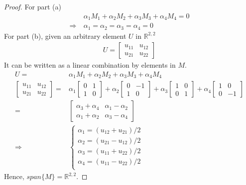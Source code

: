 \documentclass{article}
\theoremstyle{definition} %
\newcommand{\RR}{\mathbb{R}}
\begin{document}
\begin{proof}
    For part (a)
    \begin{align*}
        &\alpha_1 M_1 + \alpha_2 M_2 + \alpha_3 M_3 + \alpha_4 M_4 = 0
        \\
        \Rightarrow\ 
        &\alpha_1 = \alpha_2 = \alpha_3 = \alpha_4 = 0
    \end{align*}
    For part (b), given an arbitrary element $U$ in $\RR^{2,2}$
    \begin{align*}
        U = 
        \begin{bmatrix}
            u_{11} & u_{12}\\
            u_{21} & u_{22}
        \end{bmatrix}
    \end{align*}
    It can be written as a linear combination by elements in $M$.
    \begin{align*}
        U =& \alpha_1 M_1 + \alpha_2 M_2 + \alpha_3 M_3 + \alpha_4 M_4 \\
        \begin{bmatrix}
            u_{11} & u_{12}\\
            u_{21} & u_{22}
        \end{bmatrix}
        =& 
        \alpha_1
        \begin{bmatrix}
            0 & 1\\
            1 & 0
        \end{bmatrix}
        +
        \alpha_2
        \begin{bmatrix}
            0 & -1\\
            1 & 0
        \end{bmatrix}
        +
        \alpha_3
        \begin{bmatrix}
            1 & 0\\
            0 & 1
        \end{bmatrix}
        +
        \alpha_4
        \begin{bmatrix}
            1 & 0\\
            0 & -1
        \end{bmatrix}
        \\
        =&
        \begin{bmatrix}
            \alpha_3 + \alpha_4 & \alpha_1 - \alpha_2\\
            \alpha_1 + \alpha_2 & \alpha_3 - \alpha_4
        \end{bmatrix}
        \\
        \Rightarrow\ 
        & \left\{
        \begin{array}{lll}
            \alpha_1 = (u_{12} + u_{21})/2\\
            \alpha_2 = (u_{21} - u_{12})/2\\
            \alpha_3 = (u_{11} + u_{22})/2\\
            \alpha_4 = (u_{11} - u_{22})/2\\
        \end{array}
        \right. 
    \end{align*}
    Hence, $span\{M\}=\RR^{2,2}$.
\end{proof}
\end{document}
